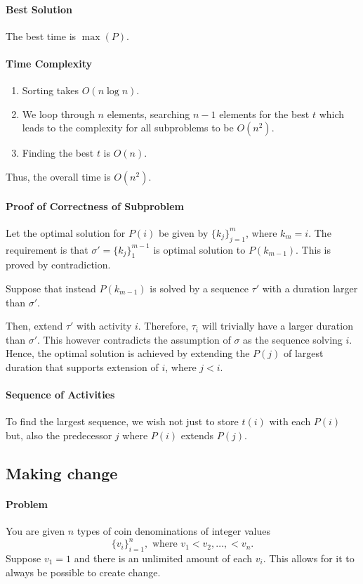 \paragraph{Best Solution}
The best time is \(\max(P)\).

\paragraph{Time Complexity}
\begin{enumerate}
  \item Sorting takes \(O(n \log n)\).
  \item We loop through \(n\) elements, searching  \(n - 1\) elements for the
    best  \(t\) which leads to the complexity for all subproblems
    to be \(O(n^2)\).
  \item Finding the best \(t\) is \(O(n)\).
\end{enumerate}
Thus, the overall time is \(O(n^2)\).

\paragraph{Proof of Correctness of Subproblem}
Let the optimal solution for \(P(i)\) be given by \( \{k_j\}_{j=1}^m \),
where \(k_m = i\).
The requirement is that \(\sigma' = \{k_j\}_{1}^{m - 1}\) is optimal solution
to \(P(k_{m - 1})\). This is proved by contradiction.

Suppose that instead \(P(k_{m - 1})\) is solved by a sequence
\(\tau'\) with a duration larger than  \(\sigma'\).

Then, extend \(\tau'\) with activity  \(i\). Therefore,
\(\tau_i\) will trivially have a larger duration than  \(\sigma'\).
This however contradicts the assumption of \(\sigma\) as the sequence
solving \(i\).
Hence, the optimal solution is achieved by extending the \(P(j)\) of largest duration
that supports extension of \(i\), where  \(j < i\).

\paragraph{Sequence of Activities}
To find the largest sequence, we wish not just to store \(t(i)\) with
each  \(P(i)\) but, also the predecessor \(j\) where \(P(i)\)
extends  \(P(j)\).

\subsection{Making change}
\paragraph{Problem}
You are given \(n\) types of coin denominations of integer values \[
  \{v_i\}_{i=1}^n, \text{ where } v_1 < v_2, \ldots, < v_n
.\] 
Suppose \(v_1 = 1\) and there is an unlimited amount of each \(v_i\).
This allows for it to always be possible to create change. 


